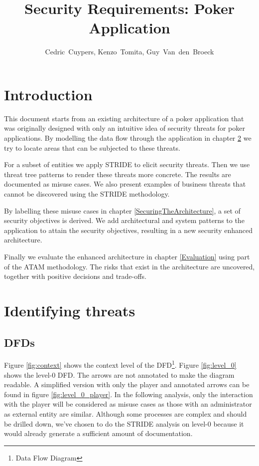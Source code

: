 \documentclass[a4paper,11pt]{report}
\author{Cedric~Cuypers, Kenzo~Tomita, Guy~Van~den~Broeck}
\title{Security Requirements: Poker Application}
\begin{document}
\maketitle
\tableofcontents

\listoffigures

\chapter{Introduction}
This document starts from an existing architecture of a poker application that was originally designed with only an intuitive idea of security threats for poker applications. By modelling the data flow through the application in chapter \ref{IdentifyingThreats} we try to locate areas that can be subjected to these threats.

For a subset of entities we apply STRIDE to elicit security threats. Then we use threat tree patterns to render these threats more concrete. The results are documented as misuse cases. We also present examples of business threats that cannot be discovered using the STRIDE methodology.

By labelling these misuse cases in chapter \ref{SecuringTheArchitecture}, a set of security objectives is derived. We add architectural and system patterns to the application to attain the security objectives, resulting in a new security enhanced architecture.

Finally we evaluate the enhanced architecture in chapter \ref{Evaluation} using part of the ATAM methodology. The risks that exist in the architecture are uncovered, together with positive decisions and trade-offs.


\chapter{Identifying threats}
\label{IdentifyingThreats}
\section{DFDs}
Figure \ref{fig:context} shows the context level of the DFD\footnote{Data Flow Diagram}. Figure \ref{fig:level_0} shows the level-0 DFD. The arrows are not annotated to make the diagram readable. A simplified version with only the player and annotated arrows can be found in figure \ref{fig:level_0_player}. In the following analysis, only the interaction with the player will be considered as misuse cases as those with an administrator as external entity are similar. Although some processes are complex and should be drilled down, we've chosen to do the STRIDE analysis on level-0 because it would already generate a sufficient amount of documentation.
\end{document}
